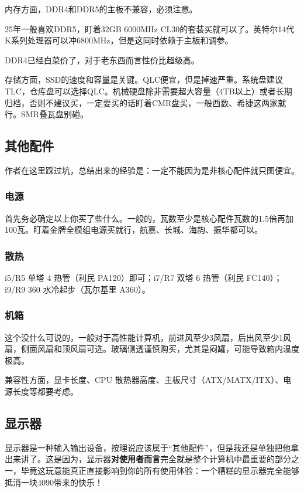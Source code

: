 \documentclass[../main.tex]{subfiles}
\begin{document}
内存方面，DDR4和DDR5的主板不兼容，必须注意。

25年一般喜欢DDR5，盯着32GB 6000MHz CL30的套装买就可以了。英特尔14代K系列处理器可以冲6800MHz，但是这同时依赖于主板和调参。

DDR4已经白菜价了，对于老东西而言性价比超级高。

存储方面，SSD的速度和容量是关键。QLC便宜，但是掉速严重。系统盘建议TLC，仓库盘可以选择QLC。机械硬盘除非需要超大容量（4TB以上）或者长期归档，否则不建议买，一定要买的话盯着CMR盘买，一般西数、希捷这两家就行。SMR叠瓦盘别碰。

\subsection{其他配件}

作者在这里踩过坑，总结出来的经验是：一定不能因为是非核心配件就只图便宜。

\subsubsection{电源}

首先务必确定以上你买了些什么。一般的，瓦数至少是核心配件瓦数的1.5倍再加100瓦。盯着金牌全模组电源买就行，航嘉、长城、海韵、振华都可以。

\subsubsection{散热}

i5/R5 单塔 4 热管（利民 PA120）即可；i7/R7 双塔 6 热管（利民 FC140）；i9/R9 360 水冷起步（瓦尔基里 A360）。

\subsubsection{机箱}

这个没什么可说的，一般对于高性能计算机，前进风至少3风扇，后出风至少1风扇，侧面风扇和顶风扇可选。玻璃侧透谨慎购买，尤其是闷罐，可能导致箱内温度极高。

兼容性方面，显卡长度、CPU 散热器高度、主板尺寸（ATX/MATX/ITX）、电源长度等都要考虑。

\subsection{显示器}

显示器是一种输入输出设备，按理说应该属于“其他配件”，但是我还是单独把他拿出来讲了。这是因为，显示器\textbf{对使用者而言}完全就是整个计算机中最重要的部分之一，毕竟这玩意能真正直接影响到你的所有使用体验：一个糟糕的显示器完全能够抵消一块4090带来的快乐！
\end{document}
